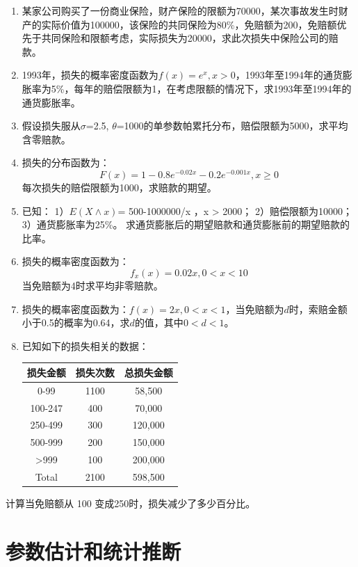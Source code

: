 \documentclass[
]{book}
\begin{document}
\begin{enumerate}
\def\labelenumi{\arabic{enumi}.}
\item
  某家公司购买了一份商业保险，财产保险的限额为70000，某次事故发生时财产的实际价值为100000，该保险的共同保险为80\%，免赔额为200，免赔额优先于共同保险和限额考虑，实际损失为20000，求此次损失中保险公司的赔款。
\item
  1993年，损失的概率密度函数为\(f(x)=e^x,x>0\)，1993年至1994年的通货膨胀率为5\%，每年的赔偿限额为1，在考虑限额的情况下，求1993年至1994年的通货膨胀率。
\item
  假设损失服从\(\sigma\)=2.5, \(\theta\)=1000的单参数帕累托分布，赔偿限额为5000，求平均含零赔款。
\item
  损失的分布函数为：
  \[
  F(x)=1-0.8e^{-0.02x}-0.2e^{-0.001x},x\ge0
  \]
  每次损失的赔偿限额为1000，求赔款的期望。
\item
  已知：
  1）\(E(X\wedge x)\)= 500-1000000/x ，x \textgreater{} 2000；
  2）赔偿限额为10000；
  3）通货膨胀率为25\%。
  求通货膨胀后的期望赔款和通货膨胀前的期望赔款的比率。
\item
  损失的概率密度函数为：
  \[f_{x}(x) = 0.02x , 0 < x < 10\]
  当免赔额为4时求平均非零赔款。
\item
  损失的概率密度函数为：\(f(x)=2x,0<x<1\)，当免赔额为\(d\)时，索赔金额小于0.5的概率为0.64，求\(d\)的值，其中\(0<d<1\)。
\item
  已知如下的损失相关的数据：

  \begin{longtable}[]{@{}ccc@{}}
  \toprule
  损失金额 & 损失次数 & 总损失金额 \\
  \midrule
  \endhead
  0-99 & 1100 & 58,500 \\
  100-247 & 400 & 70,000 \\
  250-499 & 300 & 120,000 \\
  500-999 & 200 & 150,000 \\
  \textgreater999 & 100 & 200,000 \\
  Total & 2100 & 598,500 \\
  \bottomrule
  \end{longtable}
\end{enumerate}

计算当免赔额从 100 变成250时，损失减少了多少百分比。

\hypertarget{parest}{%
\chapter{参数估计和统计推断}\label{parest}}
\end{document}
